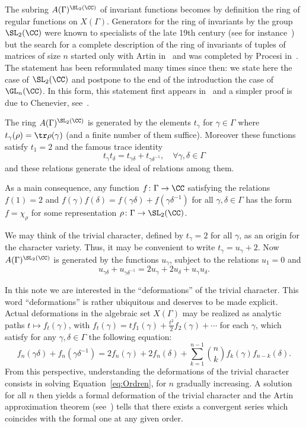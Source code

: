The subring $A(\Gamma)^{\SL_2(\CC)}$ of invariant functions becomes by
definition the ring of regular functions on $X(\Gamma)$. Generators for
the ring of invariants by the group $\SL_2(\CC)$ were known to
specialists of the late 19th century (see for instance~\cite{GraceYoung})
but the search for a complete description of the ring of invariants of
tuples of matrices of size $n$ started only with Artin in~\cite{Artin69}
and was completed by Procesi in~\cite{Procesi}.
The statement has been reformulated many times since then: we state here
the case of $\SL_2(\CC)$ and postpone to the end of the introduction the
case of~$\GL_n(\CC)$.
In this form, this statement first appears
in~\cite[Prop.\,9.1]{BrumfielHilden}
and a simpler proof is due to Chenevier,
see~\cite[Prop.\,2.3]{ChenevierHab}.
\begin{theorem}\label{theo:procesi}
The ring $A(\Gamma)^{\SL_2(\CC)}$ is generated by the elements $t_\gamma$
for $\gamma\in \Gamma$ where $t_\gamma(\rho)=\tr \rho(\gamma)$
(and a finite number of them suffice).
Moreover these functions satisfy $t_1=2$ and the famous trace identity
\[ t_\gamma t_\delta=t_{\gamma\delta}+t_{\gamma\delta^{-1}},\quad
\forall \gamma,\delta\in \Gamma \]
and these relations generate the ideal of relations among them.
\end{theorem}
As a main consequence, any function $f\colon\Gamma\to \CC$ satisfying the
relations $f(1)=2$ and
$f(\gamma)f(\delta)=f(\gamma\delta)+f(\gamma\delta^{-1})$ for all
$\gamma,\delta\in \Gamma$ has the form $f=\chi_\rho$ for some
representation $\rho\colon\Gamma\to \SL_2(\CC)$.

We may think of the trivial character, defined by $t_\gamma=2$ for all
$\gamma$, as an origin for the character variety. Thus, it may be convenient
to write $t_\gamma=u_\gamma+2$. Now $A(\Gamma)^{\SL_2(\CC)}$ is generated by
the functions $u_\gamma$, subject to the relations $u_1=0$ and
\begin{equation}\label{eq:u}
u_{\gamma\delta}+u_{\gamma\delta^{-1}}=
2u_\gamma+2u_\delta+u_\gamma u_\delta.
\end{equation}

In this note we are interested in the ``deformations'' of the trivial
character. This word ``deformations'' is rather ubiquitous and deserves to
be made explicit. Actual deformations in the algebraic set $X(\Gamma)$
may be realized as analytic paths $t\mapsto f_t(\gamma)$, with
$f_t(\gamma)=tf_1(\gamma)+\frac{t^2}{2}f_2(\gamma)+\cdots$ for each
$\gamma$, which satisfy for any $\gamma,\delta\in \Gamma$ the following
equation:
\begin{equation}\label{eq:Ordren}
f_n(\gamma\delta)+f_n(\gamma\delta^{-1})=2f_n(\gamma)+2f_n(\delta)+
\sum_{k=1}^{n-1}\binom{n}{k}f_k(\gamma)f_{n-k}(\delta).
\end{equation}
From this perspective, understanding the deformations of the trivial
character consists in solving Equation~\eqref{eq:Ordren},
for $n$ gradually increasing. A solution for all $n$ then yields a
formal deformation of the trivial character and the Artin approximation
theorem (see~\cite{Artin}) tells that there exists a convergent series which
coincides with the formal one at any given order.

